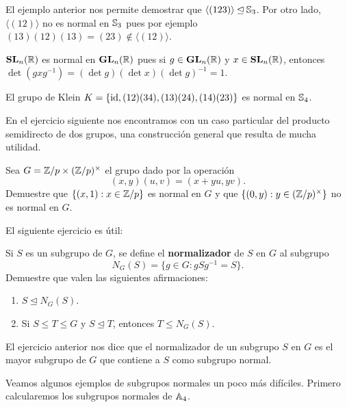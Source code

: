\begin{example}
El ejemplo anterior nos permite demostrar que $\langle (123)\rangle\unlhd\mathbb{S}_3$. Por otro lado, $\langle (12)\rangle$ no es normal en $\mathbb{S}_3$ pues
por ejemplo $(13)(12)(13)=(23)\not\in\langle(12)\rangle$. 
\end{example}

\begin{example}
$\mathbf{SL}_n(\mathbb{R})$ es normal en $\mathbf{GL}_n(\mathbb{R})$ pues si $g\in\mathbf{GL}_n(\mathbb{R})$ y $x\in\mathbf{SL}_n(\mathbb{R})$, entonces $\det(gxg^{-1})=(\det g)(\det x)(\det g)^{-1}=1$. 
\end{example}

\begin{example}
El grupo de Klein $K=\{\operatorname{id},(12)(34),(13)(24),(14)(23)\}$ es normal en $\mathbb{S}_4$. 
\end{example}


En el ejercicio siguiente nos encontramos con un caso particular del producto semidirecto de dos grupos, una construcción general que resulta de mucha utilidad. 

\begin{exercise}
Sea $G=\mathbb{Z}/p\times(\mathbb{Z}/p)^\times$ el grupo dado por la operación 
\[
(x,y)(u,v)=(x+yu,yv).
\]	
Demuestre que $\{(x,1):x\in\mathbb{Z}/p\}$ es normal en $G$ y que $\{(0,y):y\in(\mathbb{Z}/p)^\times\}$ no es normal en $G$. 
\end{exercise}

El siguiente ejercicio es útil:

\begin{exercise}
Si $S$ es un subgrupo de $G$, se define el \textbf{normalizador} de $S$ en $G$ al subgrupo
\[
N_G(S)=\{g\in G:gSg^{-1}=S\}.
\]	
Demuestre que valen las siguientes afirmaciones:
\begin{enumerate}
\item $S\unlhd N_G(S)$.
\item Si $S\leq T\leq G$ y $S\unlhd T$, entonces $T\leq N_G(S)$.
\end{enumerate}
\end{exercise}

El ejercicio anterior nos dice que el normalizador de un subgrupo $S$ en $G$ es el mayor subgrupo de $G$ que contiene a $S$ como subgrupo normal. 
 
Veamos algunos ejemplos de subgrupos normales un poco más difíciles. Primero calcularemos los subgrupos normales de $\mathbb{A}_4$. 

